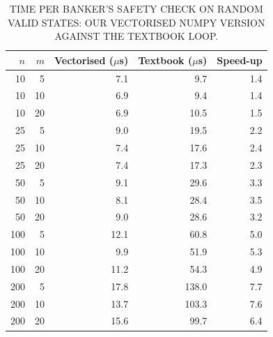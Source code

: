 \begin{table}[!htb]
\centering
\scriptsize
\caption{TIME PER BANKER'S SAFETY CHECK ON RANDOM VALID STATES: OUR VECTORISED NUMPY VERSION AGAINST THE TEXTBOOK LOOP.}
\label{tab:scaling}
\begin{tabular}{rrrrr}
\toprule
$n$ & $m$ & Vectorised ($\mu$s) & Textbook ($\mu$s) & Speed-up \\
\midrule
10 & 5 & 7.1 & 9.7 & 1.4 \\
10 & 10 & 6.9 & 9.4 & 1.4 \\
10 & 20 & 6.9 & 10.5 & 1.5 \\
25 & 5 & 9.0 & 19.5 & 2.2 \\
25 & 10 & 7.4 & 17.6 & 2.4 \\
25 & 20 & 7.4 & 17.3 & 2.3 \\
50 & 5 & 9.1 & 29.6 & 3.3 \\
50 & 10 & 8.1 & 28.4 & 3.5 \\
50 & 20 & 9.0 & 28.6 & 3.2 \\
100 & 5 & 12.1 & 60.8 & 5.0 \\
100 & 10 & 9.9 & 51.9 & 5.3 \\
100 & 20 & 11.2 & 54.3 & 4.9 \\
200 & 5 & 17.8 & 138.0 & 7.7 \\
200 & 10 & 13.7 & 103.3 & 7.6 \\
200 & 20 & 15.6 & 99.7 & 6.4 \\
\bottomrule
\end{tabular}
\end{table}
